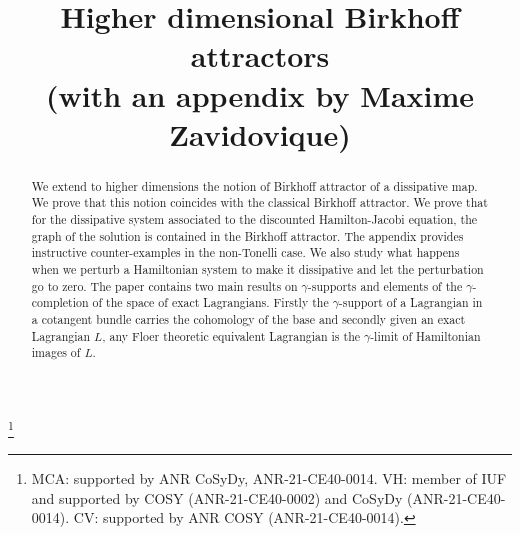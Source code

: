 \documentclass[JEP,XML,SOM,Unicode,NoFloatCountersInSection,published]{cedram}
\theoremstyle{definition}
\begin{document}
\frontmatter
\title[Higher dimensional Birkhoff attractors]{Higher dimensional Birkhoff attractors \\
(with an appendix by Maxime Zavidovique)}

\author[\initial{M.-C.} \lastname{Arnaud}]{ }
\address{Université Paris Cité and Sorbonne Université, CNRS, IMJ-PRG,\\ F-75005 Paris, France}

\author[\initial{V.} \lastname{Humilière}]{ }
\address{Sorbonne Université and Université Paris Cité, CNRS, IMJ-PRG,\\ F-75005 Paris, France}

\author[\initial{C.} \lastname{Viterbo}]{\nobreakauthor {}}
\address{Université Paris-Saclay, CNRS, Laboratoire de mathématiques d'Orsay,\\
91405, Orsay, France}

\thanks{MCA: supported by ANR CoSyDy, ANR-21-CE40-0014. VH: member of IUF and supported by COSY (ANR-21-CE40-0002) and CoSyDy (ANR-21-CE40-0014). CV: supported by ANR COSY (ANR-21-CE40-0014).}

\begin{abstract}
We extend to higher dimensions the notion of Birkhoff attractor of a dissipative map. We prove that this notion coincides with the classical Birkhoff attractor. We prove that for the dissipative system associated to the discounted Hamilton-Jacobi equation, the graph of the solution is contained in the Birkhoff attractor. The appendix provides instructive counter-examples in the non-Tonelli case. We also study what happens when we perturb a Hamiltonian system to make it dissipative and let the perturbation go to zero. The paper contains two main results on $\gamma$-supports and elements of the $\gamma$-completion of the space of exact Lagrangians. Firstly the $\gamma$-support of a Lagrangian in a cotangent bundle carries the cohomology of the base and secondly given an exact Lagrangian $L$, any Floer theoretic equivalent Lagrangian is the $\gamma$-limit of Hamiltonian images of $L$.
\end{abstract}

\end{document}
